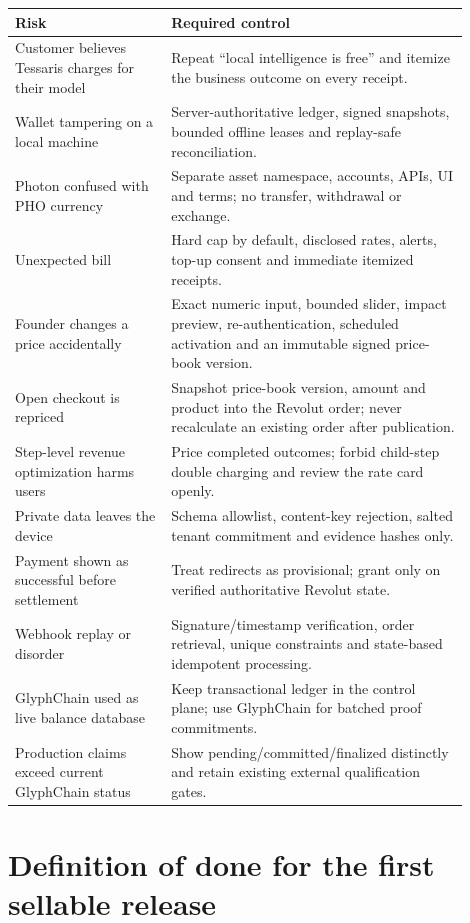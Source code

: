 \documentclass[11pt]{article}
\begin{document}
\begin{longtable}{p{0.31\linewidth} p{0.59\linewidth}}
\toprule
Risk & Required control \\
\midrule
Customer believes Tessaris charges for their model & Repeat ``local intelligence is free'' and itemize the business outcome on every receipt. \\
Wallet tampering on a local machine & Server-authoritative ledger, signed snapshots, bounded offline leases and replay-safe reconciliation. \\
Photon confused with PHO currency & Separate asset namespace, accounts, APIs, UI and terms; no transfer, withdrawal or exchange. \\
Unexpected bill & Hard cap by default, disclosed rates, alerts, top-up consent and immediate itemized receipts. \\
Founder changes a price accidentally & Exact numeric input, bounded slider, impact preview, re-authentication, scheduled activation and an immutable signed price-book version. \\
Open checkout is repriced & Snapshot price-book version, amount and product into the Revolut order; never recalculate an existing order after publication. \\
Step-level revenue optimization harms users & Price completed outcomes; forbid child-step double charging and review the rate card openly. \\
Private data leaves the device & Schema allowlist, content-key rejection, salted tenant commitment and evidence hashes only. \\
Payment shown as successful before settlement & Treat redirects as provisional; grant only on verified authoritative Revolut state. \\
Webhook replay or disorder & Signature/timestamp verification, order retrieval, unique constraints and state-based idempotent processing. \\
GlyphChain used as live balance database & Keep transactional ledger in the control plane; use GlyphChain for batched proof commitments. \\
Production claims exceed current GlyphChain status & Show pending/committed/finalized distinctly and retain existing external qualification gates. \\
\bottomrule
\end{longtable}

\section{Definition of done for the first sellable release}
\end{document}
